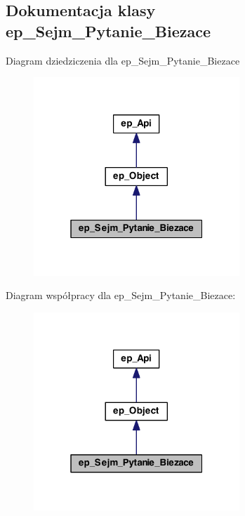 \hypertarget{classep___sejm___pytanie___biezace}{\subsection{Dokumentacja klasy ep\-\_\-\-Sejm\-\_\-\-Pytanie\-\_\-\-Biezace}
\label{classep___sejm___pytanie___biezace}
}


Diagram dziedziczenia dla ep\-\_\-\-Sejm\-\_\-\-Pytanie\-\_\-\-Biezace\nopagebreak
\begin{figure}[H]
\begin{center}
\leavevmode
\includegraphics[width=220pt]{classep___sejm___pytanie___biezace__inherit__graph}
\end{center}
\end{figure}


Diagram współpracy dla ep\-\_\-\-Sejm\-\_\-\-Pytanie\-\_\-\-Biezace\-:\nopagebreak
\begin{figure}[H]
\begin{center}
\leavevmode
\includegraphics[width=220pt]{classep___sejm___pytanie___biezace__coll__graph}
\end{center}
\end{figure}
